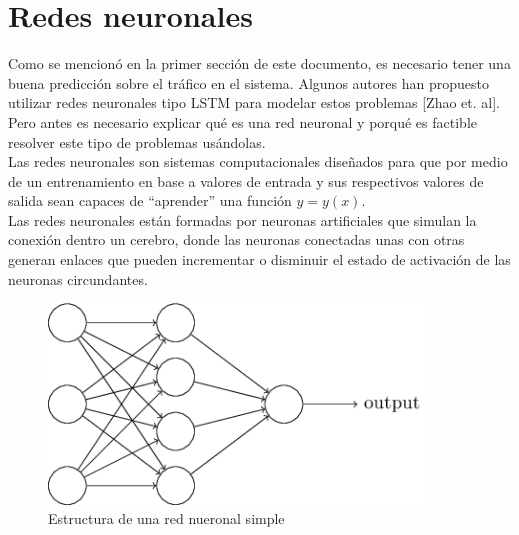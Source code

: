 \documentclass[12pt,spanish]{article}
\begin{document}
	\section{Redes neuronales}
	Como se mencionó en la primer sección de este documento, es necesario tener una buena predicción sobre el tráfico en el sistema. Algunos autores han propuesto utilizar redes neuronales tipo LSTM para modelar estos problemas [Zhao et. al]. Pero antes es necesario explicar qué es una red neuronal y porqué es factible resolver este tipo de problemas usándolas.\\
	Las redes neuronales son sistemas computacionales diseñados para que por medio de un entrenamiento en base a valores de entrada y sus respectivos valores de salida sean capaces de ``aprender'' una función $ y = y(x) $.\\
	Las redes neuronales están formadas por neuronas artificiales que simulan la conexión dentro un cerebro, donde las neuronas conectadas unas con otras generan enlaces que pueden incrementar o disminuir el estado de activación de las neuronas circundantes. 
	\begin{figure}[H]
		\centering
		\includegraphics[width=10cm]{Imagenes/neural_network_structure.png}
		\begin{centering}
			\caption{Estructura de una red nueronal simple}
		\end{centering}
	\end{figure}
	
\end{document}
